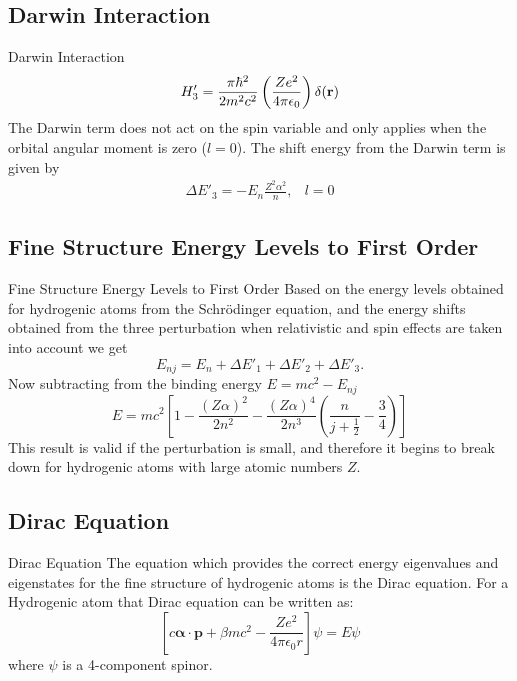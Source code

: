 \documentclass[xcolor=dvipsnames,t]{beamer}
\begin{document}
	\subsection{Darwin Interaction}
    \begin{frame}{Darwin Interaction} 
	\begin{equation}
		H'_3 = \frac{\pi\hbar^2}{2m^2c^2} \left( \frac{Ze^2}{4\pi\epsilon_0} \right) \delta(\bf{r})
	\end{equation}
    The Darwin term does not act on the spin variable and only applies when
    the orbital angular moment is zero ($l=0$).
    The shift energy from the Darwin term is given by
    \begin{equation}
        \begin{array}{ll}
        \Delta E'_3 = -E_n \frac{Z^2 \alpha^2}{n} , & l = 0
        \end{array}
    \end{equation}
    \end{frame} 

    \subsection{Fine Structure Energy Levels to First Order}
    \begin{frame}{Fine Structure Energy Levels to First Order} 
    Based on the energy levels obtained for hydrogenic atoms from the Schr\"odinger equation,
    and the energy shifts obtained from the three perturbation when relativistic and
    spin effects are taken into account we get
    \begin{equation}
        E_{nj} = E_n + \Delta E'_1 + \Delta E'_2 + \Delta E'_3.
    \end{equation}
    Now subtracting from the binding energy $E = mc^2 - E_{nj}$ 
    \begin{equation}
        E = mc^2 \left[ 1 - \frac{(Z \alpha)^2}{2n^2} - \frac{(Z \alpha)^4}{2n^3} 
                        \left(
                            \frac{n}{j + \frac{1}{2}} - \frac{3}{4}
                        \right)
                    \right] 
    \end{equation}
    This result is valid if the perturbation is small, and therefore it begins to break down
    for hydrogenic atoms with large atomic numbers $Z$.
    \end{frame} 

    \subsection{Dirac Equation}
    \begin{frame}{Dirac Equation} 
    The equation which provides the correct energy eigenvalues and eigenstates for
    the fine structure of hydrogenic atoms is the Dirac equation. 
    For a Hydrogenic atom that Dirac equation can be written as:
    \begin{equation}
        \left[ c \mathbf{\alpha} \cdot \mathbf{p} + 
               \beta m c^2 - \frac{Ze^2}{4 \pi \epsilon_0 r}
        \right] \psi = E \psi
    \end{equation}
    where $\psi$ is a 4-component spinor.
    \end{frame} 
\end{document}
